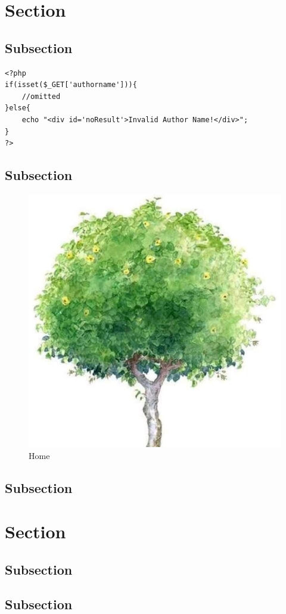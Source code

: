 \documentclass[a4paper]{article}
\begin{document}
    \tableofcontents
    \newpage
    \section{Section}
        \subsection{Subsection}
            \begin{verbatim}
<?php
if(isset($_GET['authorname'])){
    //omitted
}else{
    echo "<div id='noResult'>Invalid Author Name!</div>";
}
?>
            \end{verbatim}
        \subsection{Subsection}
            \begin{figure}[H]
            \centering
            \includegraphics[width=.5\textwidth]{img/example.png}
            \caption{Home}
            \end{figure}
        \subsection{Subsection}
    \section{Section}
        \subsection{Subsection}
        \subsection{Subsection}
\end{document}
